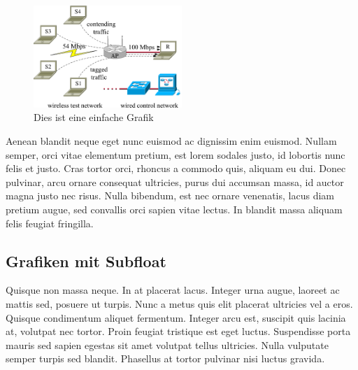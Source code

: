 \begin{figure}[htbp]
 \centering
 \includegraphics[width=0.5\textwidth]{gfx/examples/setup}
 \caption{Dies ist eine einfache Grafik}
 \label{fig:chapter03:setup}
\end{figure}

Aenean blandit neque eget nunc euismod ac dignissim enim euismod. Nullam semper, orci vitae elementum pretium, est lorem sodales justo, id lobortis nunc felis et justo. Cras tortor orci, rhoncus a commodo quis, aliquam eu dui. Donec pulvinar, arcu ornare consequat ultricies, purus dui accumsan massa, id auctor magna justo nec risus. Nulla bibendum, est nec ornare venenatis, lacus diam pretium augue, sed convallis orci sapien vitae lectus. In blandit massa aliquam felis feugiat fringilla.

\subsection{Grafiken mit Subfloat}
\label{sec:chapter03:grafiken:subfloat}
Quisque non massa neque. In at placerat lacus. Integer urna augue, laoreet ac mattis sed, posuere ut turpis. Nunc a metus quis elit placerat ultricies vel a eros. Quisque condimentum aliquet fermentum. Integer arcu est, suscipit quis lacinia at, volutpat nec tortor. Proin feugiat tristique est eget luctus. Suspendisse porta mauris sed sapien egestas sit amet volutpat tellus ultricies. Nulla vulputate semper turpis sed blandit. Phasellus at tortor pulvinar nisi luctus gravida.

